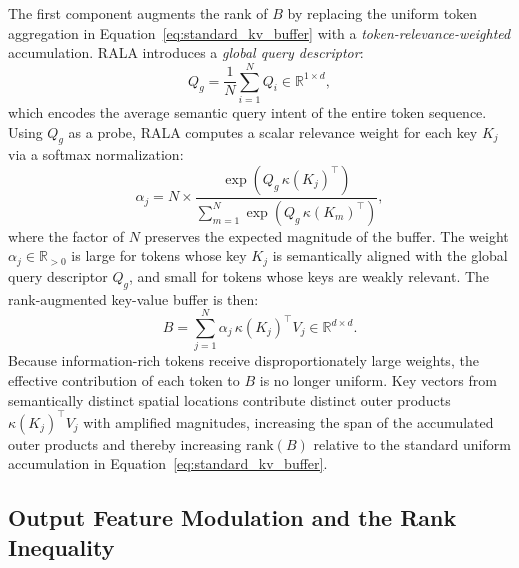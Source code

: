 The first component augments the rank of $B$ by replacing the uniform token aggregation in Equation~\ref{eq:standard_kv_buffer} with a \emph{token-relevance-weighted} accumulation. \ac{RALA} introduces a \emph{global query descriptor}:
\begin{equation}
Q_g = \frac{1}{N} \sum_{i=1}^{N} Q_i \in \mathbb{R}^{1 \times d},
\label{eq:global_query}
\end{equation}
which encodes the average semantic query intent of the entire token sequence. Using $Q_g$ as a probe, \ac{RALA} computes a scalar relevance weight for each key $K_j$ via a softmax normalization:
\begin{equation}
\alpha_j = N \times
    \frac{\exp\!\left(Q_g \,\kappa(K_j)^\top\right)}
    {\displaystyle\sum_{m=1}^{N} \exp\!\left(Q_g \,\kappa(K_m)^\top\right)},
\label{eq:alpha_softmax}
\end{equation}
where the factor of $N$ preserves the expected magnitude of the buffer. The weight $\alpha_j \in \mathbb{R}_{>0}$ is large for tokens whose key $K_j$ is semantically aligned with the global query descriptor $Q_g$, and small for tokens whose keys are weakly relevant. The rank-augmented key-value buffer is then:
\begin{equation}
B = \sum_{j=1}^{N} \alpha_j \, \kappa(K_j)^\top V_j \in \mathbb{R}^{d \times d}.
\label{eq:rala_buffer}
\end{equation}
Because information-rich tokens receive disproportionately large weights, the effective contribution of each token to $B$ is no longer uniform. Key vectors from semantically distinct spatial locations contribute distinct outer products $\kappa(K_j)^\top V_j$ with amplified magnitudes, increasing the span of the accumulated outer products and thereby increasing $\mathrm{rank}(B)$ relative to the standard uniform accumulation in Equation~\ref{eq:standard_kv_buffer}.

\subsection{Output Feature Modulation and the Rank Inequality}

